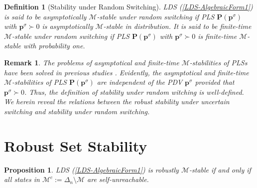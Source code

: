 \documentclass[11pt,onecolumn]{article}
\newtheorem{proposition}{Proposition}
\newtheorem{remark}{Remark}
\newtheorem{definition}{Definition}
\begin{document}
\begin{definition}[Stability under Random Switching]
   LDS (\ref{LDS-AlgebraicForm1}) is said to be asymptotically $\mathcal M$-stable under random switching if PLS $\mathbf P(\boldsymbol p^\sigma)$ with $\boldsymbol p^\sigma\succ0$ is asymptotically $\mathcal M$-stable in distribution. It is said to be finite-time $\mathcal M$-stable under random switching if PLS $\mathbf P(\boldsymbol p^\sigma)$ with $\boldsymbol p^\sigma\succ0$ is finite-time $\mathcal M$-stable with probability one.
\end{definition}

\begin{remark}
   The problems of asymptotical and finite-time $\mathcal M$-stabilities of PLSs have been solved in previous studies \cite{Guo2019Stability,Li2014State}. Evidently, the asymptotical and finite-time $\mathcal M$-stabilities of PLS $\mathbf P(\boldsymbol p^\sigma)$ are independent of the PDV $\boldsymbol p^\sigma$ provided that $\boldsymbol p^\sigma\succ0$. Thus, the definition of stability under random witching is well-defined. We herein reveal the relations between the robust stability under uncertain switching and stability under random switching.
\end{remark}










\section{Robust Set Stability}\label{SectionRobustStability}


\begin{proposition}\label{Proposition1}
   LDS (\ref{LDS-AlgebraicForm1}) is robustly $\mathcal M$-stable if and only if all states in $\mathcal M^c:=\Delta_n\setminus\mathcal M$ are self-unreachable.
\end{proposition}
\end{document}
